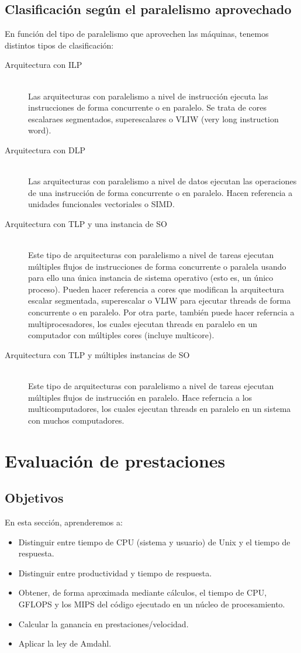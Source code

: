 \subsection{Clasificación según el paralelismo aprovechado}
En función del tipo de paralelismo que aprovechen las máquinas, tenemos distintos tipos de clasificación:
\begin{description}
    \item [Arquitectura con ILP]~\\
        Las arquitecturas con paralelismo a nivel de instrucción ejecuta las instrucciones de forma concurrente o en paralelo. Se trata de cores escalaraes segmentados, superescalares o VLIW (very long instruction word).
    \item [Arquitectura con DLP]~\\
        Las arquitecturas con paralelismo a nivel de datos ejecutan las operaciones de una instrucción de forma concurrente o en paralelo. Hacen referencia a unidades funcionales vectoriales o SIMD.
    \item [Arquitectura con TLP y una instancia de SO]~\\
        Este tipo de arquitecturas con paralelismo a nivel de tareas ejecutan múltiples flujos de instrucciones de forma concurrente o paralela usando para ello una única instancia de sistema operativo (esto es, un único proceso). Pueden hacer referencia a cores que modifican la arquitectura escalar segmentada, superescalar o VLIW para ejecutar threads de forma concurrente o en paralelo. Por otra parte, también puede hacer referncia a multiprocesadores, los cuales ejecutan threads en paralelo en un computador con múltiples cores (incluye multicore).
    \item [Arquitectura con TLP y múltiples instancias de SO]~\\
        Este tipo de arquitecturas con paralelismo a nivel de tareas ejecutan múltiples flujos de instrucción en paralelo. Hace referncia a los multicomputadores, los cuales ejecutan threads en paralelo en un sistema con muchos computadores.
\end{description}

\newpage
\section{Evaluación de prestaciones}
\subsection{Objetivos}
En esta sección, aprenderemos a:
\begin{itemize}
    \item Distinguir entre tiempo de CPU (sistema y usuario) de Unix y el tiempo de respuesta.
    \item Distinguir entre productividad y tiempo de respuesta.
    \item Obtener, de forma aproximada mediante cálculos, el tiempo de CPU, GFLOPS y los MIPS del código ejecutado en un núcleo de procesamiento.
    \item Calcular la ganancia en prestaciones/velocidad.
    \item Aplicar la ley de Amdahl.
\end{itemize}

